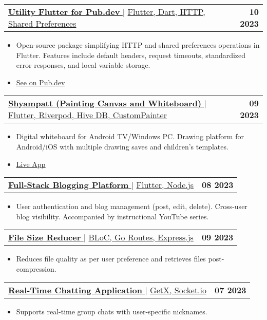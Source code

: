\documentclass[letterpaper,11pt]{article}
\makeatletter
\newcommand{\resumeItem}[1]{
  \item\small{
    {#1 \vspace{-2pt}}
  }
}
\newcommand{\resumeProjectHeading}[2]{
    \item
    \begin{tabular*}{1.001\textwidth}{l@{\extracolsep{\fill}}r}
      \small#1 & \textbf{\small #2}\\
    \end{tabular*}\vspace{-7pt}
}
\newcommand{\resumeItemListStart}{\begin{itemize}}
\newcommand{\resumeItemListEnd}{\end{itemize}\vspace{-5pt}}
\makeatother
\begin{document}
\resumeProjectHeading
{\href{https://pub.dev/packages/utility_flutter}{\textbf{\large{\underline{Utility Flutter for Pub.dev}}} \href{https://pub.dev/packages/utility_flutter}{\raisebox{-0.1\height}\faLink }} $|$ \large{\underline{Flutter, Dart, HTTP, Shared Preferences}}}{10 2023}
\resumeItemListStart
\resumeItem{\normalsize{Open-source package simplifying HTTP and shared preferences operations in Flutter. Features include default headers, request timeouts, standardized error responses, and local variable storage.}}
\resumeItem{\textcolor{accent}{\href{https://pub.dev/packages/utility_flutter}{\underline{\normalsize{See on Pub.dev}}}}}
\resumeItemListEnd
\vspace{-13pt}

\resumeProjectHeading
{\href{https://play.google.com/store/apps/details?id=com.mylight.shyampatt}{\textbf{\large{\underline{Shyampatt (Painting Canvas and Whiteboard)}}} \href{https://play.google.com/store/apps/details?id=com.mylight.shyampatt}{\raisebox{-0.1\height}\faLink }} $|$ \large{\underline{Flutter, Riverpod, Hive DB, CustomPainter}}}{09 2023}
\resumeItemListStart
\resumeItem{\normalsize{Digital whiteboard for Android TV/Windows PC. Drawing platform for Android/iOS with multiple drawing saves and children's templates.}}
\resumeItem{\textcolor{accent}{\href{https://play.google.com/store/apps/details?id=com.mylight.shyampatt}{\underline{\normalsize{Live App}}}}}
\resumeItemListEnd
\vspace{-13pt}

\resumeProjectHeading
{\href{https://youtu.be/aWNm1VBFQII?si=b1k3bZqeIRd4xkF6}{\textbf{\large{\underline{Full-Stack Blogging Platform}}} \href{https://youtu.be/aWNm1VBFQII?si=b1k3bZqeIRd4xkF6}{\raisebox{-0.1\height}\faLink }} $|$ \large{\underline{Flutter, Node.js}}}{08 2023}
\resumeItemListStart
\resumeItem{\normalsize{User authentication and blog management (post, edit, delete). Cross-user blog visibility. Accompanied by instructional YouTube series.}}
\resumeItemListEnd

\resumeProjectHeading
{\href{https://github.com/navneetprajapati26/file_reducer}{\textbf{\large{\underline{File Size Reducer}}} \href{https://github.com/navneetprajapati26/file_reducer}{\raisebox{-0.1\height}\faLink }} $|$ \large{\underline{BLoC, Go Routes, Express.js}}}{09 2023}
\resumeItemListStart
\resumeItem{\normalsize{Reduces file quality as per user preference and retrieves files post-compression.}}
\resumeItemListEnd

\resumeProjectHeading
{\href{https://github.com/navneetprajapati26/chat_app}{\textbf{\large{\underline{Real-Time Chatting Application}}} \href{https://github.com/navneetprajapati26/chat_app}{\raisebox{-0.1\height}\faLink }} $|$ \large{\underline{GetX, Socket.io}}}{07 2023}
\resumeItemListStart
\resumeItem{\normalsize{Supports real-time group chats with user-specific nicknames.}}
\resumeItemListEnd
\end{document}
